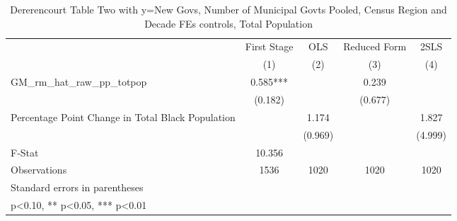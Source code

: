 \begin{table}[htbp]\centering
\def\sym#1{\ifmmode^{#1}\else\(^{#1}\)\fi}
\caption{Dererencourt Table Two with y=New Govs, Number of Municipal Govts  Pooled, Census Region and Decade FEs controls, Total Population}
\begin{tabular}{l*{4}{c}}
\toprule
                    & First Stage   &         OLS   &Reduced Form   &        2SLS   \\
                    &\multicolumn{1}{c}{(1)}   &\multicolumn{1}{c}{(2)}   &\multicolumn{1}{c}{(3)}   &\multicolumn{1}{c}{(4)}   \\
\midrule
GM\_rm\_hat\_raw\_pp\_totpop&       0.585***&               &       0.239   &               \\
                    &     (0.182)   &               &     (0.677)   &               \\
\addlinespace
Percentage Point Change in Total Black Population&               &       1.174   &               &       1.827   \\
                    &               &     (0.969)   &               &     (4.999)   \\
\midrule
F-Stat              &      10.356   &               &               &               \\
Observations        &        1536   &        1020   &        1020   &        1020   \\
\bottomrule
\multicolumn{5}{l}{\footnotesize Standard errors in parentheses}\\
\multicolumn{5}{l}{\footnotesize * p<0.10, ** p<0.05, *** p<0.01}\\
\end{tabular}
\end{table}
